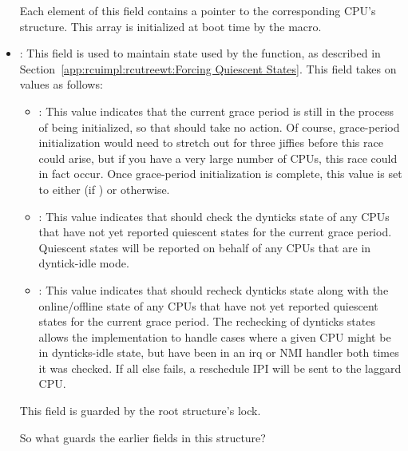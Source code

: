 \begin{itemize}
	Each element of this field contains a pointer to the
	corresponding CPU's  structure.
	This array is initialized at boot time by the
	 macro.
\item	{}:
	This field is used to maintain state used by the
	 function, as described in
	Section~\ref{app:rcuimpl:rcutreewt:Forcing Quiescent States}.
	This field takes on values as follows:
	\begin{itemize}
	\item	{}:
		This value indicates that the current grace period
		is still in the process of being initialized,
		so that  should take
		no action.
		Of course, grace-period initialization would need
		to stretch out for three jiffies before this race
		could arise, but if you have a very large number
		of CPUs, this race could in fact occur.
		Once grace-period initialization is complete,
		this value is set to either 
		(if ) or  otherwise.
	\item	{}:
		This value indicates that 
		should check the dynticks state of any CPUs that have
		not yet reported quiescent states for the current
		grace period.
		Quiescent states will be reported on behalf of any
		CPUs that are in dyntick-idle mode.
	\item	{}:
		This value indicates that 
		should recheck dynticks state along with the online/offline
		state of any CPUs that have
		not yet reported quiescent states for the current
		grace period.
		The rechecking of dynticks states allows the implementation
		to handle cases where a given CPU might be in dynticks-idle
		state, but have been in an irq or NMI handler both
		times it was checked.
		If all else fails, a reschedule IPI will be sent to
		the laggard CPU.
	\end{itemize}
	This field is guarded by the root  structure's lock.

\QuickQuiz{}
	So what guards the earlier fields in this structure?
 \QuickQuizEnd


\end{itemize}
